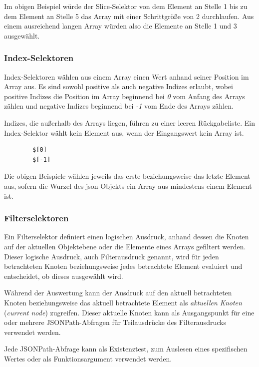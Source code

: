 \documentclass[oneside]{ausarbeitung}
\begin{document}
	 Im obigen Beispiel würde der Slice-Selektor von dem Element an Stelle 1 bis zu dem Element an Stelle 5 das Array mit einer Schrittgröße von 2 durchlaufen. Aus einem ausreichend langen Array würden also die Elemente an Stelle 1 und 3 ausgewählt. 
	  
	
	
	\subsubsection{Index-Selektoren}
	
	Index-Selektoren wählen aus einem Array einen Wert anhand seiner Position im Array aus. Es sind sowohl positive als auch negative Indizes erlaubt, wobei positive Indizes die Position im Array beginnend bei \textit{0} vom Anfang des Arrays zählen und negative Indizes beginnend bei \textit{-1} vom Ende des Arrays zählen.
	
	Indizes, die außerhalb des Arrays liegen, führen zu einer leeren Rückgabeliste. Ein Index-Selektor wählt kein Element aus, wenn der Eingangswert kein Array ist.
	
	\begin{lstlisting}
		$[0]
		$[-1]
	\end{lstlisting}
	
	Die obigen Beispiele wählen jeweils das erste beziehungsweise das letzte Element aus, sofern die Wurzel des \ac{json}-Objekts ein Array aus mindestens einem Element ist. 
	
	
	
	\subsubsection{Filterselektoren}
	
	Ein Filterselektor definiert einen logischen Ausdruck, anhand dessen die Knoten auf der aktuellen Objektebene oder die Elemente eines Arrays gefiltert werden. Dieser logische Ausdruck, auch Filterausdruck genannt, wird für jeden betrachteten Knoten beziehungsweise jedes betrachtete Element evaluiert und entscheidet, ob dieses ausgewählt wird. 
	
	Während der Auswertung kann der Ausdruck auf den aktuell betrachteten Knoten beziehungsweise das aktuell betrachtete Element als \textit{aktuellen Knoten} (\textit{current node}) zugreifen. Dieser aktuelle Knoten kann als Ausgangspunkt für eine oder mehrere JSONPath-Abfragen für Teilausdrücke des Filterausdrucks verwendet werden.
	
	Jede JSONPath-Abfrage kann als Existenztest, zum Auslesen eines spezifischen Wertes oder als Funktionsargument verwendet werden.
	
\end{document}

